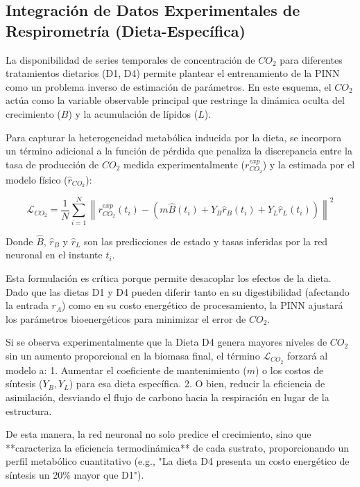 \subsection{Integración de Datos Experimentales de Respirometría (Dieta-Específica)}

La disponibilidad de series temporales de concentración de $CO_2$ para diferentes tratamientos dietarios (D1, D4) permite plantear el entrenamiento de la PINN como un problema inverso de estimación de parámetros. En este esquema, el $CO_2$ actúa como la variable observable principal que restringe la dinámica oculta del crecimiento ($B$) y la acumulación de lípidos ($L$).

Para capturar la heterogeneidad metabólica inducida por la dieta, se incorpora un término adicional a la función de pérdida que penaliza la discrepancia entre la tasa de producción de $CO_2$ medida experimentalmente ($r_{CO_2}^{exp}$) y la estimada por el modelo físico ($\hat{r}_{CO_2}$):

\begin{equation}
\mathcal{L}_{CO_2} = \frac{1}{N} \sum_{i=1}^{N} \left\| r_{CO_2}^{exp}(t_i) - \left( m\hat{B}(t_i) + Y_B \hat{r}_B(t_i) + Y_L \hat{r}_L(t_i) \right) \right\|^2
\end{equation}

Donde $\hat{B}$, $\hat{r}_B$ y $\hat{r}_L$ son las predicciones de estado y tasas inferidas por la red neuronal en el instante $t_i$.

Esta formulación es crítica porque permite desacoplar los efectos de la dieta. Dado que las dietas D1 y D4 pueden diferir tanto en su digestibilidad (afectando la entrada $r_A$) como en su costo energético de procesamiento, la PINN ajustará los parámetros bioenergéticos para minimizar el error de $CO_2$.

Si se observa experimentalmente que la Dieta D4 genera mayores niveles de $CO_2$ sin un aumento proporcional en la biomasa final, el término $\mathcal{L}_{CO_2}$ forzará al modelo a:
1.  Aumentar el coeficiente de mantenimiento ($m$) o los costos de síntesis ($Y_B, Y_L$) para esa dieta específica.
2.  O bien, reducir la eficiencia de asimilación, desviando el flujo de carbono hacia la respiración en lugar de la estructura.

De esta manera, la red neuronal no solo predice el crecimiento, sino que **caracteriza la eficiencia termodinámica** de cada sustrato, proporcionando un perfil metabólico cuantitativo (e.g., "La dieta D4 presenta un costo energético de síntesis un 20\% mayor que D1").

